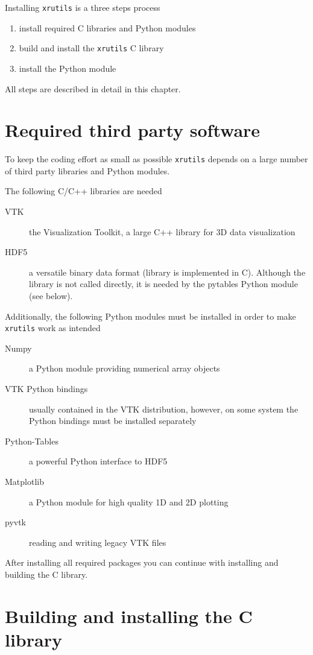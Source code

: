 
Installing {\tt xrutils} is a three steps process
\begin{enumerate}
\item install required C libraries and Python modules
\item build and install the {\tt xrutils} C library
\item install the Python module
\end{enumerate}
All steps are described in detail in this chapter.

\section{Required third party software}
To keep the coding effort as small as possible {\tt xrutils} depends on a 
large number of third party libraries and Python modules. 

The following C/C++ libraries are needed 
\begin{description}
\item[VTK] the Visualization Toolkit, a large C++ library for 3D data
visualization
\item[HDF5] a versatile binary data format (library is implemented in C).
Although the library is not called directly, it is needed by the pytables Python
module (see below).
\end{description}

Additionally, the following Python modules must be installed in order to make 
{\tt xrutils} work as intended
\begin{description}
\item[Numpy] a Python module providing numerical array objects
\item[VTK Python bindings] usually contained in the VTK distribution, however,
on some system the Python bindings must be installed separately 
\item[Python-Tables] a powerful Python interface to HDF5
\item[Matplotlib] a Python module for high quality 1D and 2D plotting
\item[pyvtk] reading and writing legacy VTK files
\end{description}
After installing all required packages you can continue with installing and
building the C library.

\section{Building and installing the C library}

